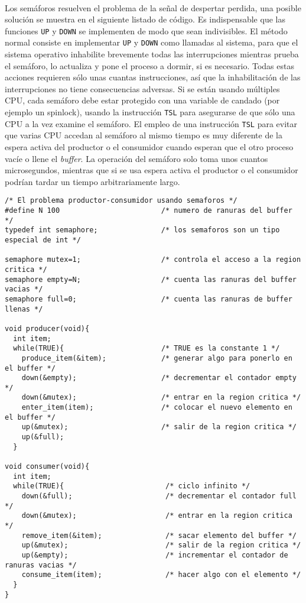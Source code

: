\documentclass{article}
\begin{document}
\\
Los sem\'aforos resuelven el problema de la se\~nal de despertar perdida, una 
posible soluci\'on se muestra en el siguiente listado de c\'odigo. Es indispensable 
que las funciones {\tt UP} y {\tt DOWN} se implementen de modo que sean indivisibles. 
El m\'etodo normal consiste en implementar {\tt UP} y {\tt DOWN} como llamadas al 
sistema, para que el sistema operativo inhabilite brevemente todas las interrupciones 
mientras prueba el sem\'aforo, lo actualiza y pone el proceso a dormir, si es necesario. 
Todas estas acciones requieren s\'olo unas cuantas instrucciones, as\'i que la 
inhabilitaci\'on de las interrupciones no tiene consecuencias adversas. Si se est\'an 
usando m\'ultiples CPU, cada sem\'aforo debe estar protegido con una variable de 
candado (por ejemplo un spinlock), usando la instrucci\'on {\tt TSL} para asegurarse 
de que s\'olo una CPU a la vez examine el sem\'aforo. El empleo de una instrucci\'on 
{\tt TSL} para evitar que varias CPU accedan al sem\'aforo al mismo tiempo es muy 
diferente de la espera activa del productor o el consumidor cuando esperan que el 
otro proceso vac\'ie o llene el {\it buffer}. La operaci\'on del sem\'aforo solo toma 
unos cuantos microsegundos, mientras que si se usa espera activa el productor o el 
consumidor podr\'ian tardar un tiempo arbitrariamente largo.
\begin{verbatim}
/* El problema productor-consumidor usando semaforos */
#define N 100                        /* numero de ranuras del buffer */
typedef int semaphore;               /* los semaforos son un tipo especial de int */

semaphore mutex=1;                   /* controla el acceso a la region critica */
semaphore empty=N;                   /* cuenta las ranuras del buffer vacias */
semaphore full=0;                    /* cuenta las ranuras de buffer llenas */

void producer(void){
  int item;
  while(TRUE){                       /* TRUE es la constante 1 */
    produce_item(&item);             /* generar algo para ponerlo en el buffer */
    down(&empty);                    /* decrementar el contador empty */
    down(&mutex);                    /* entrar en la region critica */
    enter_item(item);                /* colocar el nuevo elemento en el buffer */
    up(&mutex);                      /* salir de la region critica */
    up(&full);
  }

void consumer(void){
  int item;
  while(TRUE){                        /* ciclo infinito */
    down(&full);                      /* decrementar el contador full */
    down(&mutex);                     /* entrar en la region critica */
    remove_item(&item);               /* sacar elemento del buffer */
    up(&mutex);                       /* salir de la region critica */
    up(&empty);                       /* incrementar el contador de ranuras vacias */
    consume_item(item);               /* hacer algo con el elemento */
  }
}
\end{verbatim}
\end{document}
